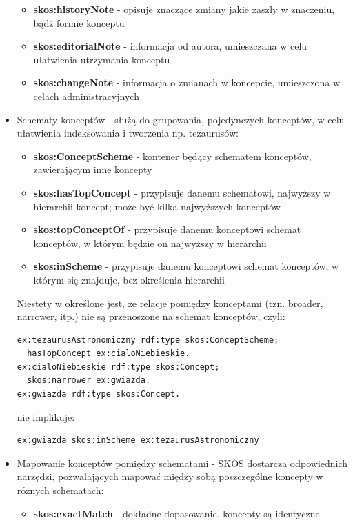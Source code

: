 \documentclass[12pt,a4paper,notitlepage]{article}
\begin{document}
\begin{itemize}
\begin{itemize}
      \item \textbf{skos:historyNote} - opisuje znaczące zmiany jakie zaszły w 
        znaczeniu, bądź formie konceptu
      \item \textbf{skos:editorialNote} - informacja od autora, umieszczana 
        w celu ułatwienia utrzymania konceptu
      \item \textbf{skos:changeNote} - informacja o zmianach w koncepcie,
        umieszczona w celach administracyjnych
    \end{itemize}
  \item Schematy konceptów - służą do grupowania, pojedynczych konceptów, w
    celu ułatwienia indeksowania i tworzenia np. tezaurusów:
    \begin{itemize}
      \item \textbf{skos:ConceptScheme} - kontener będący schematem konceptów,
        zawierającym inne koncepty
      \item \textbf{skos:hasTopConcept} - przypisuje danemu schematowi,
        najwyższy w hierarchii koncept; może być kilka najwyższych konceptów
      \item \textbf{skos:topConceptOf} - przypisuje danemu konceptowi
        schemat konceptów, w którym będzie on najwyższy w hierarchii
      \item \textbf{skos:inScheme} - przypisuje danemu konceptowi schemat
        konceptów, w którym się znajduje, bez określenia hierarchii
    \end{itemize}
    Niestety w \cite{SKOS-ref} określone jest, że relacje pomiędzy konceptami
    (tzn. broader, narrower, itp.) nie są przenoszone na schemat konceptów,
    czyli:
\begin{verbatim}
ex:tezaurusAstronomiczny rdf:type skos:ConceptScheme;
  hasTopConcept ex:cialoNiebieskie.
ex:cialoNiebieskie rdf:type skos:Concept;
  skos:narrower ex:gwiazda.
ex:gwiazda rdf:type skos:Concept.
\end{verbatim}
    nie implikuje:
\begin{verbatim}
ex:gwiazda skos:inScheme ex:tezaurusAstronomiczny
\end{verbatim}
    \item Mapowanie konceptów pomiędzy schematami - SKOS dostarcza odpowiednich
      narzędzi, pozwalających mapować między sobą poszczególne koncepty w 
      różnych schematach:
      \begin{itemize}
        \item \textbf{skos:exactMatch} - dokładne dopasowanie, koncepty
          są identyczne

\end{itemize}
\end{itemize}
\end{document}

